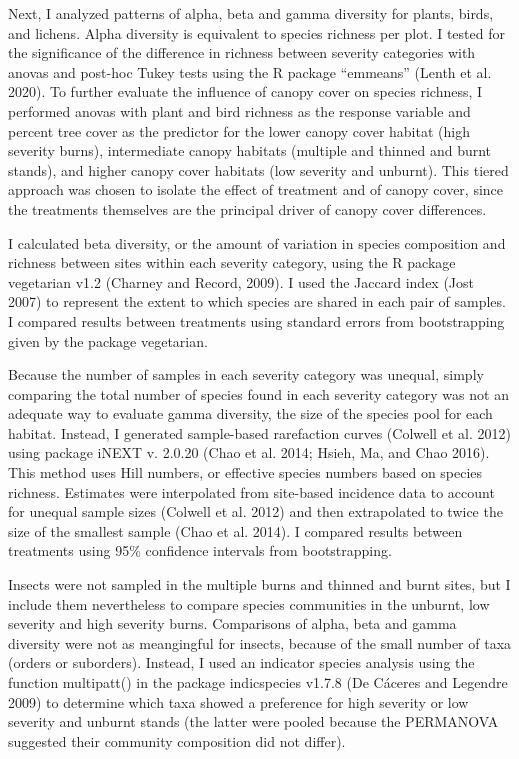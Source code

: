 \documentclass[]{article}
\begin{document}
Next, I analyzed patterns of alpha, beta and gamma diversity for plants,
birds, and lichens. Alpha diversity is equivalent to species richness
per plot. I tested for the significance of the difference in richness
between severity categories with anovas and post-hoc Tukey tests using
the R package ``emmeans'' (Lenth et al. 2020). To further evaluate the
influence of canopy cover on species richness, I performed anovas with
plant and bird richness as the response variable and percent tree cover
as the predictor for the lower canopy cover habitat (high severity
burns), intermediate canopy habitats (multiple and thinned and burnt
stands), and higher canopy cover habitats (low severity and unburnt).
This tiered approach was chosen to isolate the effect of treatment and
of canopy cover, since the treatments themselves are the principal
driver of canopy cover differences.

I calculated beta diversity, or the amount of variation in species
composition and richness between sites within each severity category,
using the R package vegetarian v1.2 (Charney and Record, 2009). I used
the Jaccard index (Jost 2007) to represent the extent to which species
are shared in each pair of samples. I compared results between
treatments using standard errors from bootstrapping given by the package
vegetarian.

Because the number of samples in each severity category was unequal,
simply comparing the total number of species found in each severity
category was not an adequate way to evaluate gamma diversity, the size
of the species pool for each habitat. Instead, I generated sample-based
rarefaction curves (Colwell et al. 2012) using package iNEXT v. 2.0.20
(Chao et al. 2014; Hsieh, Ma, and Chao 2016). This method uses Hill
numbers, or effective species numbers based on species richness.
Estimates were interpolated from site-based incidence data to account
for unequal sample sizes (Colwell et al. 2012) and then extrapolated to
twice the size of the smallest sample (Chao et al. 2014). I compared
results between treatments using 95\% confidence intervals from
bootstrapping.

Insects were not sampled in the multiple burns and thinned and burnt
sites, but I include them nevertheless to compare species communities in
the unburnt, low severity and high severity burns. Comparisons of alpha,
beta and gamma diversity were not as meangingful for insects, because of
the small number of taxa (orders or suborders). Instead, I used an
indicator species analysis using the function multipatt() in the package
indicspecies v1.7.8 (De Cáceres and Legendre 2009) to determine which
taxa showed a preference for high severity or low severity and unburnt
stands (the latter were pooled because the PERMANOVA suggested their
community composition did not differ).
\end{document}
